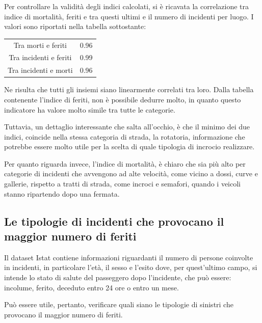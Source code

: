 \documentclass[a4paper,12pt]{report}
\begin{document}
Per controllare la validità degli indici calcolati, si è ricavata la correlazione 
tra indice di mortalità, feriti e tra questi ultimi e il numero di incidenti per 
luogo. 
I valori sono riportati nella tabella sottostante: 

\begin{center}
    \def\arraystretch{1.5}%
    \begin{tabular}{ |c|c| }
        \hline
        \rowcolor{TableGray}
        Tra morti e feriti      & 0.96 \\ 
        Tra incidenti e feriti  & 0.99 \\
        \rowcolor{TableGray}
        Tra incidenti e morti   & 0.96 \\
        \hline
    \end{tabular}
\end{center}

Ne risulta che tutti gli insiemi siano linearmente correlati tra loro. 
Dalla tabella contenente l'indice di feriti, non è possibile dedurre molto, 
in quanto questo indicatore ha valore molto simile tra tutte le categorie. 

Tuttavia, un dettaglio interessante che salta all'occhio, è che il minimo dei due indici, 
coincide nella stessa categoria di strada, 
la rotatoria, informazione che potrebbe essere molto utile per 
la scelta di quale tipologia di incrocio realizzare. 

Per quanto riguarda invece, l'indice di mortalità, è chiaro che sia più alto 
per categorie di incidenti che avvengono ad alte velocità, come vicino a dossi, 
curve e gallerie, rispetto a tratti di strada, come incroci e semafori, 
quando i veicoli stanno ripartendo dopo una fermata.

\subsection{Le tipologie di incidenti che provocano il maggior numero di feriti}

Il dataset Istat contiene informazioni riguardanti il numero di persone coinvolte 
in incidenti, in particolare l'età, il sesso e l'esito dove, 
per quest'ultimo campo, si intende lo stato di salute del passeggero 
dopo l'incidente, che può essere: incolume, ferito, deceduto entro 24 ore o entro un mese. 

Può essere utile, pertanto, verificare quali siano le tipologie di 
sinistri che provocano il maggior numero di feriti.
\end{document}
